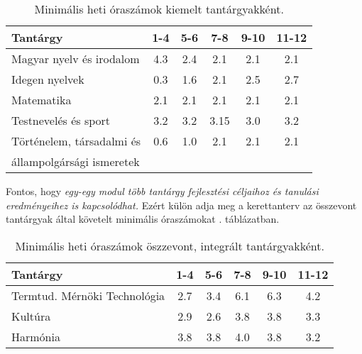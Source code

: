 \begin{table}[ht]
  \begin{center}
  \begin{tabular}{l|c|c|c|c|c}
  \textbf{Tantárgy}                                   & \textbf{1-4}  & \textbf{5-6}  & \textbf{7-8 } & \textbf{9-10} & \textbf{11-12} \\ \hline \hline
  Magyar nyelv és irodalom                            & 4.3 & 2.4  & 2.1  & 2.1  & 2.1   \\  \hline 
  Idegen nyelvek                                      & 0.3 & 1.6  & 2.1  & 2.5 & 2.7  \\  \hline 
  Matematika                                          & 2.1 & 2.1 & 2.1  & 2.1  & 2.1   \\  \hline 
  Testnevelés és sport                                & 3.2  & 3.2  & 3.15 & 3.0 & 3.2  \\  \hline 
  Történelem, társadalmi és                           & 0.6 & 1.0 & 2.1  & 2.1  & 2.1   \\  
  állampolgársági ismeretek                           &      &      &      &      &       \\ 
  \end{tabular}
  \caption{Minimális heti óraszámok kiemelt tantárgyakként.  }
  \label{tbl:oraszamok_kiemelt}
\end{center}
  \end{table}

Fontos, hogy \emph{egy-egy modul több tantárgy fejlesztési céljaihoz és tanulási eredményeihez is kapcsolódhat.} Ezért külön adja meg a kerettanterv az összevont tantárgyak által követelt minimális óraszámokat . táblázatban.

\begin{table}[ht]
  \begin{center}
    \begin{tabular}{l|c|c|c|c|c}
  \textbf{Tantárgy}                                   & \textbf{1-4}  & \textbf{5-6}  & \textbf{7-8 } & \textbf{9-10} & \textbf{11-12} \\  \hline  \hline 
  Termtud. Mérnöki Technológia                        & 2.7 & 3.4 & 6.1 & 6.3  & 4.2   \\  \hline 
  Kultúra                                             & 2.9 & 2.6 & 3.8 & 3.8 & 3.3  \\  \hline 
  Harmónia                                            & 3.8 & 3.8 & 4.0 & 3.8 & 3.2 
  \end{tabular}
  \caption{Minimális heti óraszámok öszzevont, integrált tantárgyakként.  }
  \label{tbl:oraszamok_osszevont}
\end{center}
  \end{table}

  
